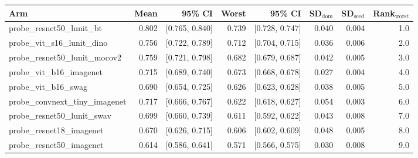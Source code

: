 \begin{tabular}{lrrrrrrr}
\toprule
Arm & Mean & 95\% CI & Worst & 95\% CI & SD$_\text{dom}$ & SD$_\text{seed}$ & Rank$_\text{worst}$ \\
\midrule
probe\_resnet50\_lunit\_bt & 0.802 & [0.765, 0.840] & 0.739 & [0.728, 0.747] & 0.040 & 0.004 & 1.0 \\
probe\_vit\_s16\_lunit\_dino & 0.756 & [0.722, 0.789] & 0.712 & [0.704, 0.715] & 0.036 & 0.006 & 2.0 \\
probe\_resnet50\_lunit\_mocov2 & 0.759 & [0.721, 0.798] & 0.682 & [0.679, 0.687] & 0.042 & 0.005 & 3.0 \\
probe\_vit\_b16\_imagenet & 0.715 & [0.689, 0.740] & 0.673 & [0.668, 0.678] & 0.027 & 0.004 & 4.0 \\
probe\_vit\_b16\_swag & 0.690 & [0.654, 0.725] & 0.626 & [0.623, 0.628] & 0.038 & 0.005 & 5.0 \\
probe\_convnext\_tiny\_imagenet & 0.717 & [0.666, 0.767] & 0.622 & [0.618, 0.627] & 0.054 & 0.003 & 6.0 \\
probe\_resnet50\_lunit\_swav & 0.699 & [0.660, 0.739] & 0.611 & [0.592, 0.622] & 0.043 & 0.008 & 7.0 \\
probe\_resnet18\_imagenet & 0.670 & [0.626, 0.715] & 0.606 & [0.602, 0.609] & 0.048 & 0.005 & 8.0 \\
probe\_resnet50\_imagenet & 0.614 & [0.586, 0.641] & 0.571 & [0.566, 0.575] & 0.030 & 0.008 & 9.0 \\
\bottomrule
\end{tabular}
